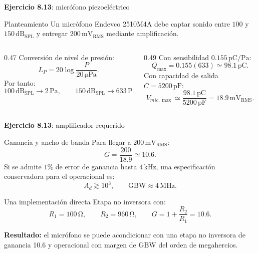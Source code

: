 \documentclass[aspectratio=169,9pt]{beamer}
\newcommand{\exercise}[1]{\textbf{Ejercicio #1}}
\newcommand{\result}[1]{\textbf{\color{eiTeal}Resultado:} #1}
\newcommand{\unit}[1]{\,\mathrm{#1}}
\newcommand{\GBW}{\mathrm{GBW}}
\begin{document}
\begin{frame}{\exercise{8.13}: micrófono piezoeléctrico}
  \begin{block}{Planteamiento}
    Un micrófono Endevco 2510M4A debe captar sonido entre \(100\) y \(150\unit{dB_{SPL}}\) y entregar \(200\unit{mV_{RMS}}\) mediante amplificación.
  \end{block}

  \begin{columns}[T,onlytextwidth]
    \begin{column}{0.47\textwidth}
      Conversión de nivel de presión:
      \[
        L_P=20\log\frac{P}{20\unit{\mu Pa}}.
      \]
      Por tanto:
      \[
        100\unit{dB_{SPL}}\to 2\unit{Pa},
        \qquad
        150\unit{dB_{SPL}}\to 633\unit{Pa}.
      \]
    \end{column}
    \begin{column}{0.49\textwidth}
      Con sensibilidad \(0.155\unit{pC/Pa}\):
      \[
        Q_{\max}=0.155(633)\simeq98.1\unit{pC}.
      \]
      Con capacidad de salida \(C=5200\unit{pF}\):
      \[
        V_{mic,\max}\simeq\frac{98.1\unit{pC}}{5200\unit{pF}}
        =18.9\unit{mV_{RMS}}.
      \]
    \end{column}
  \end{columns}
\end{frame}

\begin{frame}{\exercise{8.13}: amplificador requerido}
  \begin{block}{Ganancia y ancho de banda}
    Para llegar a \(200\unit{mV_{RMS}}\):
    \[
      G=\frac{200}{18.9}\simeq 10.6 .
    \]
    Si se admite \(1\%\) de error de ganancia hasta \(4\unit{kHz}\), una especificación conservadora para el operacional es:
    \[
      A_d\gtrsim 10^3,
      \qquad
      \GBW\approx 4\unit{MHz}.
    \]
  \end{block}

  \begin{block}{Una implementación directa}
    Etapa no inversora con:
    \[
      R_1=100\unit{\Omega},\qquad R_2=960\unit{\Omega},
      \qquad G=1+\frac{R_2}{R_1}=10.6.
    \]
  \end{block}

  \result{el micrófono se puede acondicionar con una etapa no inversora de ganancia 10.6 y operacional con margen de \(\GBW\) del orden de megahercios.}
\end{frame}
\end{document}
